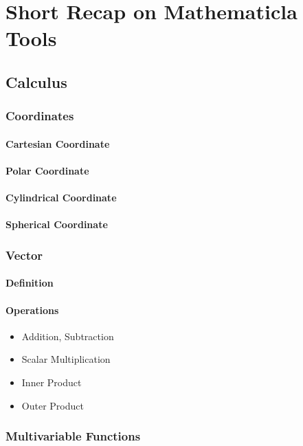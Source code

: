 \section{Short Recap on Mathematicla Tools}

\subsection{Calculus}

\subsubsection{Coordinates} 


\paragraph{Cartesian Coordinate}
\paragraph{Polar Coordinate}
\paragraph{Cylindrical Coordinate}
\paragraph{Spherical Coordinate }


\subsubsection{Vector} 

\paragraph{Definition}

\paragraph{Operations} 

\begin{itemize}
\item Addition, Subtraction 
\item Scalar Multiplication 
\item Inner Product
\item Outer Product
\end{itemize}


\subsubsection{Multivariable Functions} 

